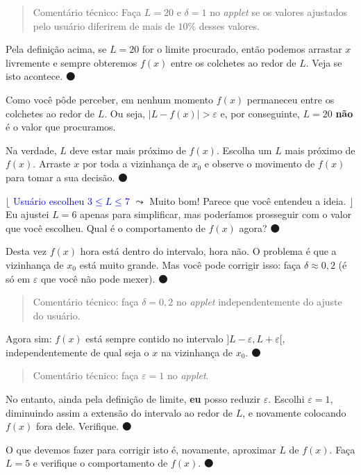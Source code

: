 \documentclass[fleqn,12pt]{scrartcl}
\newenvironment{ct}{\begin{quotation}\color{red!30!black}\sffamily\small Comentário técnico: }{\end{quotation}} %
\newcommand\foreign[1]{\textsl{#1}}
\newcommand\proceed{\textcolor{green!50!black}{$\medbullet$}\xspace}
\newcommand\condicional[2]{$\lfloor$%
	\textsf{\textcolor{blue}{{\footnotesize #1}}}
	$\leadsto$ #2%
	$\rfloor$}
\begin{document}
    \begin{ct}
	Faça $L = 20$ e $\delta = 1$ no \foreign{applet} se os valores ajustados pelo usuário diferirem de mais de $10\%$ desses valores.
    \end{ct}

    Pela definição acima, se $L = 20$ for o limite procurado, então podemos arrastar $x$ livremente e sempre obteremos $f(x)$ entre os colchetes ao redor de $L$. Veja se isto acontece. \proceed

    Como você pôde perceber, em nenhum momento $f(x)$ permaneceu entre os colchetes ao redor de $L$. Ou seja, $|L - f(x)| > \varepsilon$ e, por conseguinte, $L = 20$ \textbf{não} é o valor que procuramos.

    Na verdade, $L$ deve estar mais próximo de $f(x)$. Escolha um $L$ mais próximo de $f(x)$. Arraste $x$ por toda a vizinhança de $x_0$ e observe o movimento de $f(x)$ para tomar a sua decisão. \proceed

    \condicional{Usuário escolheu $3 \le L \le 7$}{Muito bom! Parece que você entendeu a ideia.} Eu ajustei $L = 6$ apenas para simplificar, mas poderíamos prosseguir com o valor que você escolheu. Qual é o comportamento de $f(x)$ agora? \proceed

    Desta vez $f(x)$ hora está dentro do intervalo, hora não. O problema é que a vizinhança de $x_0$ está muito grande. Mas você pode corrigir isso: faça $\delta \approx 0,2$ (é só em $\varepsilon$ que você não pode mexer). \proceed

    \begin{ct}
	faça $\delta = 0,2$ no \foreign{applet} independentemente do ajuste do usuário.
    \end{ct}

    Agora sim: $f(x)$ está sempre contido no intervalo $]L - \varepsilon, L + \varepsilon[$, independentemente de qual seja o $x$ na vizinhança de $x_0$. \proceed
    
    \begin{ct}
	faça $\varepsilon = 1$ no \foreign{applet}.
    \end{ct}
   
    No entanto, ainda pela definição de limite, \textbf{eu} posso reduzir $\varepsilon$. Escolhi $\varepsilon = 1$, diminuindo assim a extensão do intervalo ao redor de $L$, e novamente colocando $f(x)$ fora dele. Verifique. \proceed

    O que devemos fazer para corrigir isto é, novamente, aproximar $L$ de $f(x)$. Faça $L = 5$ e verifique o comportamento de $f(x)$. \proceed
\end{document}
